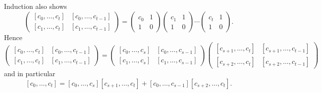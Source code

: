 \documentclass[12pt,a4paper]{article}
\newcommand{\ExpansionOf}[1]{[#1]}
\newcommand{\LastIndex}{t}
\newcommand{\MidIndex}{s}
\newcommand{\Entry}[1][]{c_{#1}}
\begin{document}
  Induction also shows
  \[
    \begin{pmatrix}
      \ExpansionOf{\Entry[0],\ldots,\Entry[\LastIndex]}
      &
        \ExpansionOf{\Entry[0],\ldots,\Entry[\LastIndex-1]}
      \\
      \ExpansionOf{\Entry[1],\ldots,\Entry[\LastIndex]}
      &
        \ExpansionOf{\Entry[1],\ldots,\Entry[\LastIndex-1]}
    \end{pmatrix}
    =
    \begin{pmatrix}
      \Entry[0] & 1 \\
      1 & 0
    \end{pmatrix}
    \begin{pmatrix}
      \Entry[1] & 1 \\
      1 & 0
    \end{pmatrix}
    \cdots
    \begin{pmatrix}
      \Entry[\LastIndex] & 1 \\
      1 & 0
    \end{pmatrix}
    .
  \]
  Hence
  \[
    \begin{pmatrix}
      \ExpansionOf{\Entry[0],\ldots,\Entry[\LastIndex]}
      &
        \ExpansionOf{\Entry[0],\ldots,\Entry[\LastIndex-1]}
      \\
      \ExpansionOf{\Entry[1],\ldots,\Entry[\LastIndex]}
      &
        \ExpansionOf{\Entry[1],\ldots,\Entry[\LastIndex-1]}
    \end{pmatrix}
    =
    \begin{pmatrix}
      \ExpansionOf{\Entry[0],\ldots,\Entry[\MidIndex]}
      &
        \ExpansionOf{\Entry[0],\ldots,\Entry[\MidIndex-1]}
      \\
      \ExpansionOf{\Entry[1],\ldots,\Entry[\MidIndex]}
      &
        \ExpansionOf{\Entry[1],\ldots,\Entry[\MidIndex-1]}
    \end{pmatrix}
    \begin{pmatrix}
      \ExpansionOf{\Entry[\MidIndex+1],\ldots,\Entry[\LastIndex]}
      &
        \ExpansionOf{\Entry[\MidIndex+1],\ldots,\Entry[\LastIndex-1]}
      \\
      \ExpansionOf{\Entry[\MidIndex+2],\ldots,\Entry[\LastIndex]}
      &
        \ExpansionOf{\Entry[\MidIndex+2],\ldots,\Entry[\LastIndex-1]}
    \end{pmatrix}
  \]
  and in particular
  \[
    \ExpansionOf{\Entry[0],\ldots,\Entry[\LastIndex]}
    =
    \ExpansionOf{\Entry[0],\ldots,\Entry[\MidIndex]}
    \ExpansionOf{\Entry[\MidIndex+1],\ldots,\Entry[\LastIndex]}
    +
    \ExpansionOf{\Entry[0],\ldots,\Entry[\MidIndex-1]}
    \ExpansionOf{\Entry[\MidIndex+2],\ldots,\Entry[\LastIndex]}
    .
  \]
\end{document}
